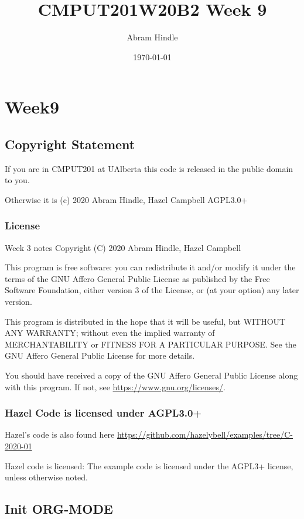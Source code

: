 \documentclass[11pt]{article}
\author{Abram Hindle}
\date{\today}
\title{CMPUT201W20B2 Week 9}
\begin{document}
\maketitle
\tableofcontents


\section{Week9}
\label{sec:orgc4a2973}
\subsection{Copyright Statement}
\label{sec:org30925d6}

If you are in CMPUT201 at UAlberta this code is released in the public
domain to you.

Otherwise it is (c) 2020 Abram Hindle, Hazel Campbell AGPL3.0+

\subsubsection{License}
\label{sec:org28647cd}

Week 3 notes
Copyright (C) 2020 Abram Hindle, Hazel Campbell

This program is free software: you can redistribute it and/or modify
it under the terms of the GNU Affero General Public License as
published by the Free Software Foundation, either version 3 of the
License, or (at your option) any later version.

This program is distributed in the hope that it will be useful,
but WITHOUT ANY WARRANTY; without even the implied warranty of
MERCHANTABILITY or FITNESS FOR A PARTICULAR PURPOSE.  See the
GNU Affero General Public License for more details.

You should have received a copy of the GNU Affero General Public License
along with this program.  If not, see \url{https://www.gnu.org/licenses/}.


\subsubsection{Hazel Code is licensed under AGPL3.0+}
\label{sec:org3d0fff1}

Hazel's code is also found here
\url{https://github.com/hazelybell/examples/tree/C-2020-01}

Hazel code is licensed: The example code is licensed under the AGPL3+
license, unless otherwise noted.

\subsection{Init ORG-MODE}
\label{sec:orgef3028d}
\end{document}
